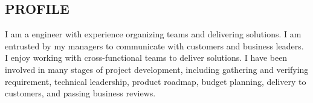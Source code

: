 \documentclass[line,margin]{res}
\begin{document}
\address{sam.tanner@bakerhughes.com}
\address{(339) 223-2004}


\begin{resume}

	\section{PROFILE}
	I am a engineer with experience organizing teams and delivering solutions.  I am entrusted by my managers to communicate with customers and business leaders. I enjoy working with cross-functional teams to deliver solutions.
	I have been involved in many stages of project development, including gathering and verifying requirement, technical leadership, product roadmap, budget planning, delivery to customers, and passing business reviews.


\end{resume}
\end{document}
